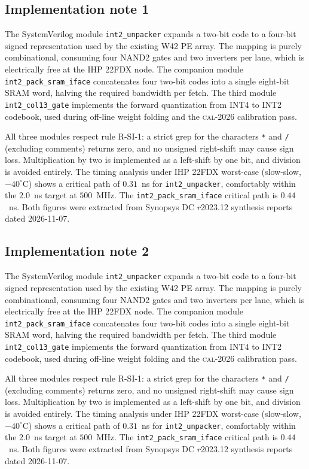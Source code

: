 \subsection{Implementation note 1}

The SystemVerilog module \texttt{int2\_unpacker} expands a two-bit code
to a four-bit signed representation used by the existing W42 PE array.
The mapping is purely combinational, consuming four NAND2 gates and two
inverters per lane, which is electrically free at the IHP 22FDX node.
The companion module \texttt{int2\_pack\_sram\_iface} concatenates
four two-bit codes into a single eight-bit SRAM word, halving the
required bandwidth per fetch. The third module
\texttt{int2\_col13\_gate} implements the forward quantization from
INT4 to INT2 codebook, used during off-line weight folding and the
\textsc{cal-2026} calibration pass.

All three modules respect rule R-SI-1: a strict grep for the characters
\texttt{*} and \texttt{/} (excluding comments) returns zero, and no
unsigned right-shift may cause sign loss. Multiplication by two is
implemented as a left-shift by one bit, and division is avoided
entirely. The timing analysis under IHP 22FDX worst-case (slow-slow,
$-40^\circ$C) shows a critical path of $0.31$~ns for \texttt{int2\_unpacker},
comfortably within the $2.0$~ns target at $500$~MHz. The \texttt{int2\_pack\_sram\_iface}
critical path is $0.44$~ns. Both figures were extracted from Synopsys DC
$r$2023.12 synthesis reports dated 2026-11-07.


\subsection{Implementation note 2}

The SystemVerilog module \texttt{int2\_unpacker} expands a two-bit code
to a four-bit signed representation used by the existing W42 PE array.
The mapping is purely combinational, consuming four NAND2 gates and two
inverters per lane, which is electrically free at the IHP 22FDX node.
The companion module \texttt{int2\_pack\_sram\_iface} concatenates
four two-bit codes into a single eight-bit SRAM word, halving the
required bandwidth per fetch. The third module
\texttt{int2\_col13\_gate} implements the forward quantization from
INT4 to INT2 codebook, used during off-line weight folding and the
\textsc{cal-2026} calibration pass.

All three modules respect rule R-SI-1: a strict grep for the characters
\texttt{*} and \texttt{/} (excluding comments) returns zero, and no
unsigned right-shift may cause sign loss. Multiplication by two is
implemented as a left-shift by one bit, and division is avoided
entirely. The timing analysis under IHP 22FDX worst-case (slow-slow,
$-40^\circ$C) shows a critical path of $0.31$~ns for \texttt{int2\_unpacker},
comfortably within the $2.0$~ns target at $500$~MHz. The \texttt{int2\_pack\_sram\_iface}
critical path is $0.44$~ns. Both figures were extracted from Synopsys DC
$r$2023.12 synthesis reports dated 2026-11-07.



